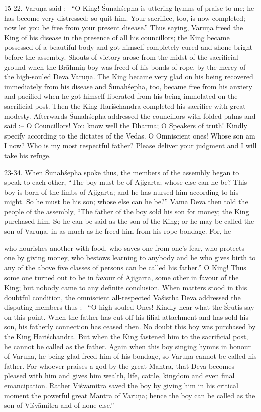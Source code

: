 15-22. Varu\d{n}a said :-- ``O King! \'Sunah\'sepha is uttering hymns of praise to me; he has become very distressed; so quit him. Your sacrifice, too, is now completed; now let you be free from your present disease.'' Thus saying, Varu\d{n}a freed the King of his disease in the presence of all his councillors; the King became possessed of a beautiful body and got himself completely cured and shone bright before the assembly. Shouts of victory arose from the midst of the sacrificial ground when the Br\=ahmi\d{n} boy was freed of his bonds of rope, by the mercy of the high-souled Deva Varu\d{n}a. The King became very glad on his being recovered immediately from his disease and \'Sunah\'sepha, too, became free from his anxiety and pacified when he got himself liberated from his being immolated on the sacrificial post. Then the King Hari\'schandra completed his sacrifice with great modesty. Afterwards \'Sunah\'sepha addressed the councillors with folded palms and said :-- O Councillors! You know well the Dharma; O Speakers of truth! Kindly specify according to the dictates of the Vedas. O Omniscient ones! Whose son am I now? Who is my most respectful father? Please deliver your judgment and I will take his refuge.

23-34. When \'Sunah\'sepha spoke thus, the members of the assembly began to speak to each other, ``The boy must be of Ajigarta; whose else can he be? This boy is born of the limbs of Ajigarta; and he has nursed him according to his might. So he must be his son; whose else can he be?'' V\=ama Deva then told the people of the assembly, ``The father of the boy sold his son for money; the King purchased him. So he can be said as the son of the King; or he may be called the son of Varu\d{n}a, in as much as he freed him from his rope bondage. For, he

who nourishes another with food, who saves one from one's fear, who protects one by giving money, who bestows learning to anybody and he who gives birth to any of the above five classes of persons can be called his father.'' O King! Thus some one turned out to be in favour of Ajigarta, some other in favour of the King; but nobody came to any definite conclusion. When matters stood in this doubtful condition, the omniscient all-respected Va\'sistha Deva addressed the disputing members thus :-- ``O high-souled Ones! Kindly hear what the \'Srutis say on this point. When the father has cut off his filial attachment and has sold his son, his fatherly connection has ceased then. No doubt this boy was purchased by the King Hari\'schandra. But when the King fastened him to the sacrificial post, he cannot be called as the father. Again when this boy singing hymns in honour of Varu\d{n}a, he being glad freed him of his bondage, so Varu\d{n}a cannot be called his father. For whoever praises a god by the great Mantra, that Deva becomes pleased with him and gives him wealth, life, cattle, kingdom and even final emancipation. Rather Vi\'sv\=amitra saved the boy by giving him in his critical moment the powerful great Mantra of Varu\d{n}a; hence the boy can be called as the son of Vi\'sv\=amitra and of none else.''

